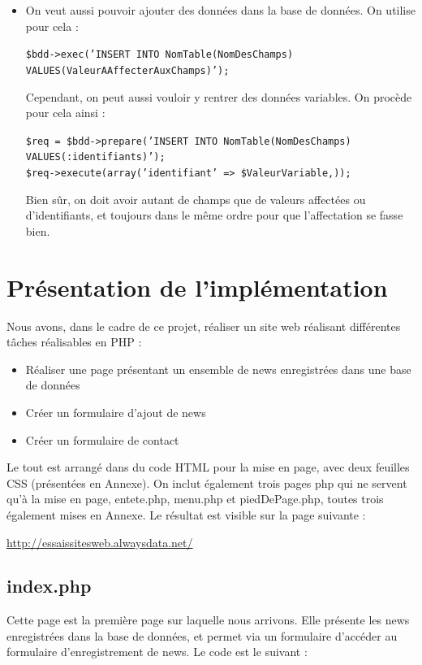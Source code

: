 \documentclass{article}
\begin{document}
\begin{itemize}
		\bigskip
	\item On veut aussi pouvoir ajouter des données dans la base de données. On utilise pour cela :
	\begin{center} \texttt{\$bdd->exec('INSERT INTO NomTable(NomDesChamps) VALUES(ValeurAAffecterAuxChamps)');} \end{center}
		Cependant, on peut aussi vouloir y rentrer des données variables. On procède pour cela ainsi :
	\begin{center} \texttt{\$req = \$bdd->prepare('INSERT INTO NomTable(NomDesChamps) VALUES(:identifiants)');\\
	\$req->execute(array('identifiant' => \$ValeurVariable,));} \end{center}
	Bien sûr, on doit avoir autant de champs que de valeurs affectées ou d'identifiants, et toujours dans le même ordre pour que l'affectation se fasse bien.

\end{itemize}

\newpage
\section{Présentation de l'implémentation}
Nous avons, dans le cadre de ce projet, réaliser un site web réalisant différentes tâches réalisables en PHP :
\begin{itemize}
	\item Réaliser une page présentant un ensemble de news enregistrées dans une base de données
	\item Créer un formulaire d'ajout de news
	\item Créer un formulaire de contact
\end{itemize}

Le tout est arrangé dans du code HTML pour la mise en page, avec deux feuilles CSS (présentées en Annexe). On inclut également trois pages php qui ne servent qu'à la mise en page, entete.php, menu.php et piedDePage.php, toutes trois également mises en Annexe.
Le résultat est visible sur la page suivante :
\begin{center} \url{http://essaissitesweb.alwaysdata.net/} \end{center}

\subsection{index.php}
Cette page est la première page sur laquelle nous arrivons. Elle présente les news enregistrées dans la base de données, et permet via un formulaire d'accéder au formulaire d'enregistrement de news. Le code est le suivant :

\end{document}
